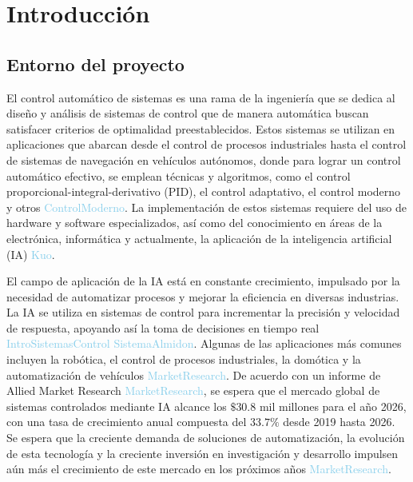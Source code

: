 
\chapter{Introducción}
\label{chp:intro}

\section{Entorno del proyecto}

El control automático de sistemas es una rama de la ingeniería que se dedica al diseño y análisis de sistemas de control que de manera automática buscan satisfacer criterios de optimalidad preestablecidos. Estos sistemas se utilizan en aplicaciones que abarcan desde el control de procesos industriales hasta el control de sistemas de navegación en vehículos autónomos, donde para lograr un control automático efectivo, se emplean técnicas y algoritmos, como el control proporcional-integral-derivativo (PID), el control adaptativo, el control moderno y otros \textcolor{SkyBlue}{ControlModerno}. La implementación de estos sistemas requiere del uso de hardware y software especializados, así como del conocimiento en áreas de la electrónica, informática y actualmente, la aplicación de la inteligencia artificial (IA) \textcolor{SkyBlue}{Kuo}.

El campo de aplicación de la IA está en constante crecimiento, impulsado por la necesidad de automatizar procesos y mejorar la eficiencia en diversas industrias. La IA se utiliza en sistemas de control para incrementar la precisión y velocidad de respuesta, apoyando así la toma de decisiones en tiempo real \textcolor{SkyBlue}{IntroSistemasControl} \textcolor{SkyBlue}{SistemaAlmidon}. Algunas de las aplicaciones más comunes incluyen la robótica, el control de procesos industriales, la domótica y la automatización de vehículos \textcolor{SkyBlue}{MarketResearch}. De acuerdo con un informe de Allied Market Research \textcolor{SkyBlue}{MarketResearch}, se espera que el mercado global de sistemas controlados mediante IA alcance los $\$ 30.8$ mil millones para el año 2026, con una tasa de crecimiento anual compuesta del $33.7\%$ desde 2019 hasta 2026. Se espera que la creciente demanda de soluciones de automatización, la evolución de esta tecnología y la creciente inversión en investigación y desarrollo impulsen aún más el crecimiento de este mercado en los próximos años \textcolor{SkyBlue}{MarketResearch}.

